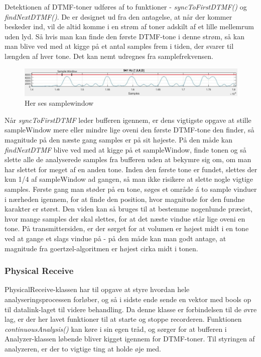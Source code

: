Detektionen af DTMF-toner udføres af to funktioner - \textit{syncToFirstDTMF()} og \textit{findNextDTMF()}. De er designet ud fra den antagelse, at når der kommer beskeder ind, vil de altid komme i en strøm af toner adskilt af et lille mellemrum uden lyd. Så hvis man kan finde den første DTMF-tone i denne strøm, så kan man blive ved med at kigge på et antal samples frem i tiden, der svarer til længden af hver tone. Det kan nemt udregnes fra samplefrekvensen. \\
\begin{figure}[h]
\centering
\includegraphics[scale=0.5]{Billeder/Samplewindow.PNG}
\caption{Her ses samplewindow}
\label{fig:Samplewindow}
\end{figure}
Når \textit{syncToFirstDTMF} leder bufferen igennem, er dens vigtigste opgave at stille sampleWindow mere eller mindre lige oveni den første DTMF-tone den finder, så magnitude på den næste gang samples er på sit højeste. På den måde kan \textit{findNextDTMF} blive ved med at kigge på et sampleWindow, finde tonen og så slette alle de analyserede samples fra bufferen uden at bekymre sig om, om man har slettet for meget af en anden tone. Inden den første tone er fundet, slettes der kun 1/4 af sampleWindow ad gangen, så man ikke risikere at slette nogle vigtige samples. Første gang man støder på en tone, søges et område á to sample vinduer i nærheden igennem, for at finde den position, hvor magnitude for den fundne karakter er størst. Den viden kan så bruges til at bestemme nogenlunde præcist, hvor mange samples der skal slettes, for at det næste vindue står lige oveni en tone. På transmittersiden, er der sørget for at volumen er højest midt i en tone ved at gange et slags vindue på - på den måde kan man godt antage, at magnitude fra goertzel-algoritmen er højest cirka midt i tonen.

\subsubsection{Physical Receive}

PhysicalReceive-klassen har til opgave at styre hvordan hele analyseringsprocessen forløber, og så i sidste ende sende en vektor med bools op til datalink-laget til videre behandling. Da denne klasse er forbindelsen til de øvre lag, er der her lavet funktioner til at starte og stoppe recorderen. Funktionen \textit{continuousAnalysis()} kan køre i sin egen tråd, og sørger for at bufferen i Analyzer-klassen løbende bliver kigget igennem for DTMF-toner. Til styringen af analyzeren, er der to vigtige ting at holde øje med.

